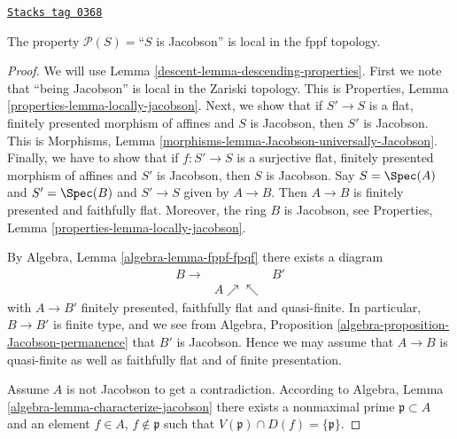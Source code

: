 \begin{lemma}
\label{descent-lemma-Jacobson-local-fppf}
\href{https://stacks.math.columbia.edu/tag/0368}{\texttt{Stacks tag 0368}}

The property $\mathcal{P}(S) =$``$S$ is Jacobson'' is local
in the fppf topology.
\end{lemma}

\begin{proof}

We will use Lemma \ref{descent-lemma-descending-properties}.
First we note that ``being Jacobson'' is local
in the Zariski topology. This is
Properties, Lemma \ref{properties-lemma-locally-jacobson}.
Next, we show that if $S' \to S$ is a flat, finitely presented
morphism of affines and $S$ is Jacobson, then $S'$ is
Jacobson. This is
Morphisms, Lemma \ref{morphisms-lemma-Jacobson-universally-Jacobson}.
Finally, we have to show that if $f : S' \to S$ is a surjective
flat, finitely presented morphism of affines and $S'$ is
Jacobson, then $S$ is Jacobson. Say $S = \Spec(A)$ and
$S' = \Spec(B)$ and $S' \to S$ given by $A \to B$.
Then $A \to B$ is finitely presented and faithfully flat.
Moreover, the ring $B$ is Jacobson, see
Properties, Lemma \ref{properties-lemma-locally-jacobson}.

\medskip\noindent
By Algebra, Lemma \ref{algebra-lemma-fppf-fpqf} there exists a diagram
$$
\begin{array}{ccc}B \longrightarrow &  & B' \\  & A \nearrow\nwarrow & \end{array}
$$
with $A \to B'$ finitely presented, faithfully flat and quasi-finite.
In particular, $B \to B'$ is finite type, and we see from
Algebra, Proposition \ref{algebra-proposition-Jacobson-permanence}
that $B'$ is Jacobson. Hence we may assume that $A \to B$ is quasi-finite
as well as faithfully flat and of finite presentation.

\medskip\noindent
Assume $A$ is not Jacobson to get a contradiction.
According to Algebra, Lemma \ref{algebra-lemma-characterize-jacobson}
there exists a nonmaximal prime $\mathfrak p \subset A$ and
an element $f \in A$, $f \not \in \mathfrak p$ such that
$V(\mathfrak p) \cap D(f) = \{\mathfrak p\}$.


\end{proof}
